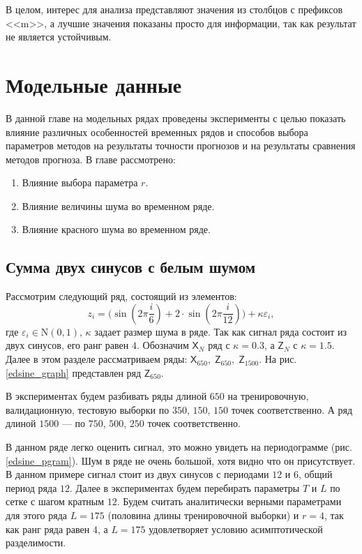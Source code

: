 \documentclass[specialist,
               substylefile = spbu.rtx,
               subf,href,colorlinks=true, 12p]{disser}
\begin{document}
В целом, интерес для анализа представляют значения из столбцов с префиксов <<m>>, а лучшие значения показаны просто для информации, так как результат не является устойчивым.

\chapter{Модельные данные}
\label{modts}

В данной главе на модельных рядах проведены эксперименты с целью показать влияние различных особенностей временных рядов и способов выбора параметров методов на результаты точности прогнозов и на результаты сравнения методов прогноза. В главе рассмотрено:

\begin{enumerate}
	\item Влияние выбора параметра $r$.
	\item Влияние величины шума во временном ряде.
	\item Влияние красного шума во временном ряде.
\end{enumerate}

\section{Сумма двух синусов с белым шумом}
\label{edsine}

Рассмотрим следующий ряд, состоящий из элементов: $$ z_i = \big(\sin(2 \pi \dfrac{i}{6} ) + 2 \cdot \sin(2 \pi \dfrac{i}{12} ) \big) + \kappa \varepsilon_i, $$ где $\varepsilon_i \in \mathrm{N}(0, 1)$, $\kappa$ задает размер шума в ряде. Так как сигнал ряда состоит из двух синусов, его ранг равен $4$. Обозначим $\mathsf{X}_N$ ряд с $\kappa = 0.3$, а $\mathsf{Z}_N$ с $\kappa = 1.5$. Далее в этом разделе рассматриваем ряды: $\mathsf{X}_{650}, \; \mathsf{Z}_{650}, \; \mathsf{Z}_{1500}$. На рис. \ref{edsine_graph} представлен ряд $\mathsf{Z}_{650}$.

В экспериментах будем разбивать ряды длиной ${650}$ на тренировочную, валидационную, тестовую выборки по $350$, $150$, $150$ точек соответственно. А ряд длиной ${1500}$ --- по $750$, $500$, $250$ точек соответственно.

В данном ряде легко оценить сигнал, это можно увидеть на периодограмме (рис. \ref{edsine_pgram}). Шум в ряде не очень большой, хотя видно что он присутствует. В данном примере сигнал стоит из двух синусов с периодами $12$ и $6$, общий период ряда $12$. Далее в экспериментах будем перебирать параметры $T$ и $L$ по сетке с шагом кратным $12$. Будем считать аналитически верными параметрами для этого ряда $L = 175$ (половина длины тренировочной выборки) и $r = 4$, так как ранг ряда равен $4$, а $L = 175$ удовлетворяет условию асимптотической разделимости.
\end{document}
